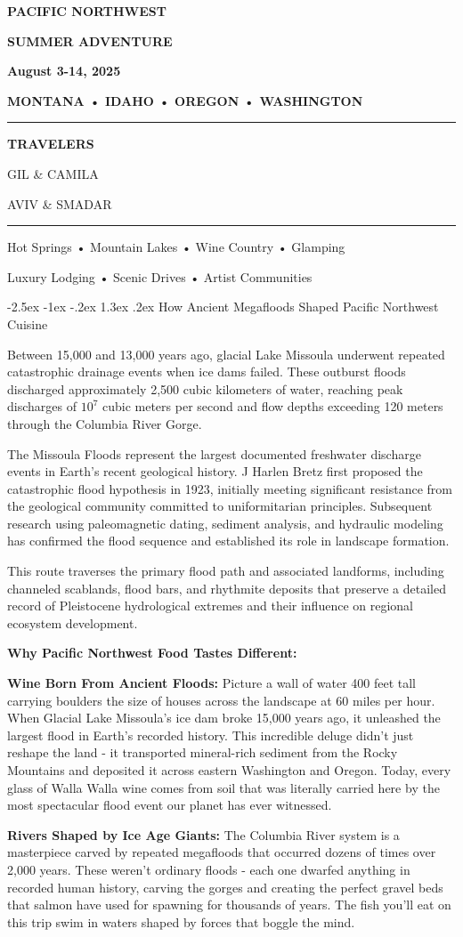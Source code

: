 \documentclass[
  11pt,
  letterpaper,
  DIV=10,
  numbers=noendperiod]{scrartcl}
\author{}
\date{Invalid Date}
\makeatletter
\renewcommand{\section}{\@startsection{section}{1}{\z@}%
  {-2.5ex \@plus -1ex \@minus -.2ex}%
  {1.3ex \@plus .2ex}%
  {\normalfont\fontsize{16}{19}\bfseries\color{twinpeaksred}}}
\def\maketitle{%
  \begin{titlepage}
    \newgeometry{margin=0.5in}

    \vspace{1cm}

    \begin{center}
      {\fontfamily{ptm}\fontsize{36}{42}\selectfont\textbf{\textcolor{twinpeaksred}{PACIFIC NORTHWEST}}}

      \vspace{0.3cm}

      {\fontfamily{ptm}\fontsize{32}{38}\selectfont\textbf{\textcolor{twinpeaksblack}{SUMMER ADVENTURE}}}

      \vspace{1cm}

      {\fontfamily{ptm}\fontsize{20}{24}\selectfont\textbf{\textcolor{twinpeaksgold}{August 3-14, 2025}}}

      \vspace{1.5cm}

      {\fontfamily{ptm}\fontsize{18}{22}\selectfont\textbf{\textcolor{twinpeaksblack}{MONTANA • IDAHO • OREGON • WASHINGTON}}}

      \vspace{2cm}

      \textcolor{twinpeaksred}{\rule{0.7\textwidth}{3pt}}

      \vspace{1cm}

      {\fontfamily{ptm}\fontsize{16}{20}\selectfont\textbf{\textcolor{twinpeaksred}{TRAVELERS}}}

      \vspace{0.5cm}

      {\fontfamily{ptm}\fontsize{14}{18}\selectfont\textcolor{twinpeaksblack}{GIL \& CAMILA}}

      \vspace{0.3cm}

      {\fontfamily{ptm}\fontsize{14}{18}\selectfont\textcolor{twinpeaksblack}{AVIV \& SMADAR}}

      \vspace{2cm}

      \textcolor{twinpeaksred}{\rule{0.5\textwidth}{2pt}}

      \vspace{0.5cm}

      {\fontfamily{ptm}\fontsize{12}{14}\selectfont\textcolor{twinpeaksblack}{Hot Springs • Mountain Lakes • Wine Country • Glamping}}

      \vspace{0.3cm}

      {\fontfamily{ptm}\fontsize{12}{14}\selectfont\textcolor{twinpeaksblack}{Luxury Lodging • Scenic Drives • Artist Communities}}

    \end{center}

    \restoregeometry
  \end{titlepage}
}
\makeatother
\begin{document}
\maketitle
\newpage

\section{How Ancient Megafloods Shaped Pacific Northwest
Cuisine}\label{how-ancient-megafloods-shaped-pacific-northwest-cuisine}

Between 15,000 and 13,000 years ago, glacial Lake Missoula underwent
repeated catastrophic drainage events when ice dams failed. These
outburst floods discharged approximately 2,500 cubic kilometers of
water, reaching peak discharges of \(10^7\) cubic meters per second and
flow depths exceeding 120 meters through the Columbia River Gorge.

The Missoula Floods represent the largest documented freshwater
discharge events in Earth's recent geological history. J Harlen Bretz
first proposed the catastrophic flood hypothesis in 1923, initially
meeting significant resistance from the geological community committed
to uniformitarian principles. Subsequent research using paleomagnetic
dating, sediment analysis, and hydraulic modeling has confirmed the
flood sequence and established its role in landscape formation.

This route traverses the primary flood path and associated landforms,
including channeled scablands, flood bars, and rhythmite deposits that
preserve a detailed record of Pleistocene hydrological extremes and
their influence on regional ecosystem development.

\textbf{Why Pacific Northwest Food Tastes Different:}

\textbf{Wine Born From Ancient Floods:} Picture a wall of water 400 feet
tall carrying boulders the size of houses across the landscape at 60
miles per hour. When Glacial Lake Missoula's ice dam broke 15,000 years
ago, it unleashed the largest flood in Earth's recorded history. This
incredible deluge didn't just reshape the land - it transported
mineral-rich sediment from the Rocky Mountains and deposited it across
eastern Washington and Oregon. Today, every glass of Walla Walla wine
comes from soil that was literally carried here by the most spectacular
flood event our planet has ever witnessed.

\textbf{Rivers Shaped by Ice Age Giants:} The Columbia River system is a
masterpiece carved by repeated megafloods that occurred dozens of times
over 2,000 years. These weren't ordinary floods - each one dwarfed
anything in recorded human history, carving the gorges and creating the
perfect gravel beds that salmon have used for spawning for thousands of
years. The fish you'll eat on this trip swim in waters shaped by forces
that boggle the mind.
\end{document}
